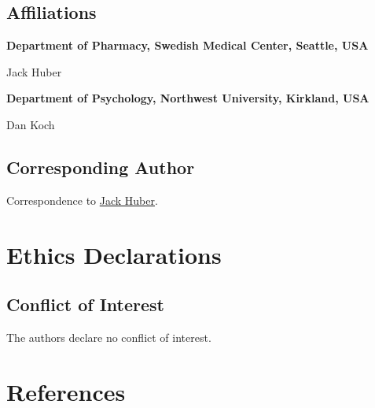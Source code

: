 \documentclass[
  letterpaper,
]{article}
\begin{document}
\hypertarget{affiliations}{%
\section*{Affiliations}\label{affiliations}}

\textbf{Department of Pharmacy, Swedish Medical Center, Seattle, USA}

Jack Huber

\textbf{Department of Psychology, Northwest University, Kirkland, USA}

Dan Koch

\hypertarget{corresponding-author}{%
\section*{Corresponding Author}\label{corresponding-author}}

Correspondence to \href{mailto:jack.bernard.huber@gmail.com}{Jack
Huber}.


\hypertarget{ethics-declarations}{%
\chapter*{Ethics Declarations}\label{ethics-declarations}}

\hypertarget{conflict-of-interest}{%
\section*{Conflict of Interest}\label{conflict-of-interest}}

The authors declare no conflict of interest.


\hypertarget{references}{%
\chapter*{References}\label{references}}
\end{document}
